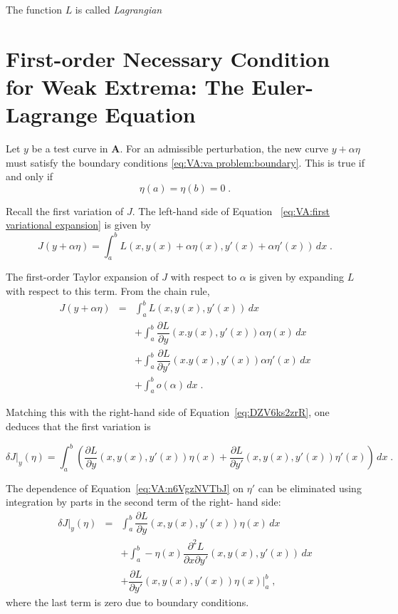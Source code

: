 The function $L$ is called \emph{Lagrangian}

\section{First-order Necessary Condition for Weak Extrema: The Euler-
Lagrange Equation}

Let $y$ be a test curve in $\mathbf{A}$. For an admissible perturbation,
the new curve $y+\alpha\eta$ must satisfy the boundary conditions 
\eqref{eq:VA:va problem:boundary}. This is true if and only if
\[\eta(a)=\eta(b)=0\;.\]

Recall the first variation of $J$. The left-hand side of Equation~
\eqref{eq:VA:first variational expansion} is given by
\begin{equation}\label{eq:DZV6ks2zrR}
J(y+\alpha\eta)=\int_a^bL(x, y(x)+\alpha\eta(x),y'(x)+\alpha\eta'(x))
\,dx\;.
\end{equation}

The first-order Taylor expansion of $J$ with respect to $\alpha$ is 
given by expanding $L$ with respect to this term. From the chain rule,
\begin{equation*}
	\begin{array}{rcl}
		J(y+\alpha\eta)&=&\displaystyle\int_a^b L(x, y(x), y'(x))\,dx\\
		&&+\displaystyle\int_a^b\dfrac{\partial L}{\partial y}(x. y(x),y'(x))\alpha\eta(x)\,dx\\
		&&+\displaystyle\int_a^b\dfrac{\partial L}{\partial y'}(x. y(x),y'(x))\alpha\eta'(x)\,dx\\
		&&+\displaystyle\int_a^b o(\alpha)\,dx\;.
	\end{array}
\end{equation*}

Matching this with the right-hand side of Equation~\eqref{eq:DZV6ks2zrR},
one deduces that the first variation is
\begin{fullwidth}
	\begin{equation}\label{eq:VA:n6VgzNVTbJ}
		\delta J|_y(\eta)=\int_a^b\left(\dfrac{\partial L}{\partial y}(x,
		y(x),y'(x))\eta(x) + \dfrac{\partial L}{\partial y'}(x,
		y(x),y'(x))\eta'(x)\right)\, dx\;.
	\end{equation}
\end{fullwidth}
The dependence of Equation~\eqref{eq:VA:n6VgzNVTbJ} on $\eta'$ can be
eliminated using integration by parts in the second term of the right-
hand side:
\begin{equation}
	\begin{array}{rcl}
	\delta J|_y(\eta)&=&\displaystyle\int_a^b\dfrac{\partial L}{\partial y}(x,
	y(x),y'(x))\eta(x)\,dx\\
	&&+\displaystyle\int_a^b - \eta(x)\dfrac{\partial^2 L}{\partial x\partial y'}(x,
	y(x),y'(x))\, dx\\
	&&+\dfrac{\partial L}{\partial y'}(x, y(x), y'(x))\eta(x)|_a^b\;,
	\end{array}
\end{equation}
where the last term is zero due to boundary conditions.

